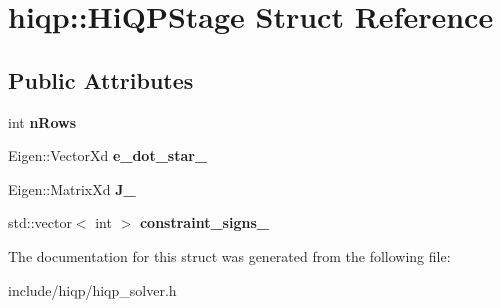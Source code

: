 \hypertarget{structhiqp_1_1HiQPStage}{\section{hiqp\-:\-:Hi\-Q\-P\-Stage Struct Reference}
\label{structhiqp_1_1HiQPStage}
}
\subsection*{Public Attributes}
\begin{DoxyCompactItemize}
\item 
\hypertarget{structhiqp_1_1HiQPStage_a058c2644d6b88fe475411fa8d41a860a}{int {\bfseries n\-Rows}}\label{structhiqp_1_1HiQPStage_a058c2644d6b88fe475411fa8d41a860a}

\item 
\hypertarget{structhiqp_1_1HiQPStage_a3e3f1a95221f1f46b9448e133089125d}{Eigen\-::\-Vector\-Xd {\bfseries e\-\_\-dot\-\_\-star\-\_\-}}\label{structhiqp_1_1HiQPStage_a3e3f1a95221f1f46b9448e133089125d}

\item 
\hypertarget{structhiqp_1_1HiQPStage_afcbf16c4621fdc0144c30e4517b63d43}{Eigen\-::\-Matrix\-Xd {\bfseries J\-\_\-}}\label{structhiqp_1_1HiQPStage_afcbf16c4621fdc0144c30e4517b63d43}

\item 
\hypertarget{structhiqp_1_1HiQPStage_a61ec5b733229b042dd2fafdd87acba90}{std\-::vector$<$ int $>$ {\bfseries constraint\-\_\-signs\-\_\-}}\label{structhiqp_1_1HiQPStage_a61ec5b733229b042dd2fafdd87acba90}

\end{DoxyCompactItemize}


The documentation for this struct was generated from the following file\-:\begin{DoxyCompactItemize}
\item 
include/hiqp/hiqp\-\_\-solver.\-h\end{DoxyCompactItemize}
